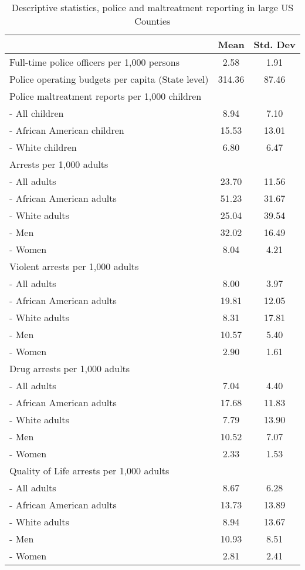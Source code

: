 \begin{table}[ht]
\centering
\caption{Descriptive statistics, police and maltreatment reporting in large US Counties} 
\label{desc3}
\begin{tabular}{lcc}
  \hline
  & Mean & Std. Dev \\ 
  \hline
Full-time police officers per 1,000 persons & 2.58 & 1.91 \\ 
  Police operating budgets per capita (State level) & 314.36 & 87.46 \\ 
  Police maltreatment reports per 1,000 children &  &  \\ 
         - All children & 8.94 & 7.10 \\ 
         - African American children & 15.53 & 13.01 \\ 
         - White children & 6.80 & 6.47 \\ 
  Arrests per 1,000 adults &  &  \\ 
         - All adults & 23.70 & 11.56 \\ 
         - African American adults & 51.23 & 31.67 \\ 
         - White adults & 25.04 & 39.54 \\ 
         - Men & 32.02 & 16.49 \\ 
         - Women & 8.04 & 4.21 \\ 
  Violent arrests per 1,000 adults &  &  \\ 
         - All adults & 8.00 & 3.97 \\ 
         - African American adults & 19.81 & 12.05 \\ 
         - White adults & 8.31 & 17.81 \\ 
         - Men & 10.57 & 5.40 \\ 
         - Women & 2.90 & 1.61 \\ 
  Drug arrests per 1,000 adults &  &  \\ 
         - All adults & 7.04 & 4.40 \\ 
         - African American adults & 17.68 & 11.83 \\ 
         - White adults & 7.79 & 13.90 \\ 
         - Men & 10.52 & 7.07 \\ 
         - Women & 2.33 & 1.53 \\ 
  Quality of Life arrests per 1,000 adults &  &  \\ 
         - All adults & 8.67 & 6.28 \\ 
         - African American adults & 13.73 & 13.89 \\ 
         - White adults & 8.94 & 13.67 \\ 
         - Men & 10.93 & 8.51 \\ 
         - Women & 2.81 & 2.41 \\ 
   \hline
\end{tabular}
\end{table}
